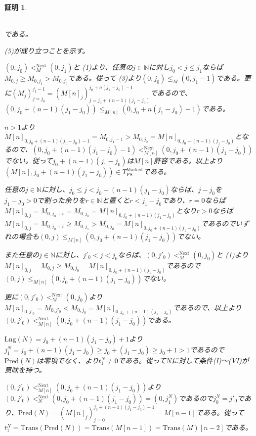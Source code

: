 \documentclass[dvipdfmx,uplatex]{jsarticle}
\theoremstyle{customnonumberbreakfortheorem}
\theoremstyle{customnonumberbreakforproof}
\newtheorem{hideableproof}{証明}
\begin{document}
\begin{hideableproof}
\begin{indented}
\begin{indented}
\begin{indented}
\begin{eqnarray*}
				\end{eqnarray*}
				\item である。
			\end{indented}
		\end{indented}
		\item
		\item (5)が成り立つことを示す。
		\item \((0,j_0) <_M^{\textrm{Next}} (0,j_1)\)と (1)より、任意の\(j \in \mathbb{N}\)に対し\(j_0 < j \leq j_1\)ならば\(M_{0,j} \geq M_{0,j_1} > M_{0,j_0}\)である。従って (3)より\((0,j_0) \leq_M (0,j_1-1)\)である。更に\((M_j)_{j=j_0}^{j_1-1} = (M[n]_j)_{j=j_0+(n-1)(j_1-j_0)}^{j_0+n(j_1-j_0)-1}\)であるので、\((0,j_0+(n-1)(j_1-j_0)) \leq_{M[n]} (0,j_0+n(j_1-j_0)-1)\)である。
		\item \(n > 1\)より\(M[n]_{0,j_0+(n-1)(j_1-j_0)-1} = M_{0,j_1-1} > M_{0,j_0} = M[n]_{0,j_0+(n-1)(j_1-j_0)}\)となるので、\((0,j_0+(n-1)(j_1-j_0)-1) <_{M[n]}^{\textrm{Next}} (0,j_0+(n-1)(j_1-j_0))\)でない。従って\(j_0+(n-1)(j_1-j_0)\)は\(M[n]\)許容である。以上より\((M[n],j_0+(n-1)(j_1-j_0)) \in T_{\textrm{PS}}^{\textrm{Marked}}\)である。
		\item 任意の\(j \in \mathbb{N}\)に対し、\(j_0 \leq j < j_0+(n-1)(j_1-j_0)\)ならば、\(j-j_0\)を\(j_1-j_0 > 0\)で割った余りを\(r \in \mathbb{N}\)と置くと\(r < j_1-j_0\)であり、\(r = 0\)ならば\(M[n]_{0,j} = M_{0,j_0+r} = M_{0,j_0} = M[n]_{0,j_0+(n-1)(j_1-j_0)}\)となり\(r > 0\)ならば\(M[n]_{0,j} = M_{0,j_0+r} \geq M_{0,j_1} > M_{0,j_0} = M[n]_{0,j_0+(n-1)(j_1-j_0)}\)であるのでいずれの場合も\((0,j) \leq_{M[n]} (0,j_0+(n-1)(j_1-j_0))\)でない。
		\item また任意の\(j \in \mathbb{N}\)に対し、\(j'_0 < j < j_0\)ならば、\((0,j'_0) <_M^{\textrm{Next}} (0,j_0)\)と (1)より\(M[n]_{0,j} = M_{0,j} \geq M_{0,j_0} = M[n]_{0,j_0+(n-1)(j_1-j_0)}\)であるので\((0,j) \leq_{M[n]} (0,j_0+(n-1)(j_1-j_0))\)でない。
		\item 更に\((0,j'_0) <_M^{\textrm{Next}} (0,j_0)\)より\(M[n]_{0,j'_0} = M_{0,j'_0} < M_{0,j_0} = M[n]_{0,j_0+(n-1)(j_1-j_0)}\)であるので、以上より\((0,j'_0) <_{M[n]}^{\textrm{Next}} (0,j_0+(n-1)(j_1-j_0))\)である。
		\item \(\textrm{Lng}(N) = j_0+(n-1)(j_1-j_0)+1\)より\(j_1^N = j_0+(n-1)(j_1-j_0) \geq j_0 + (j_1-j_0) \geq j_0+1 > 1\)であるので\(\textrm{Pred}(N)\)は零項でなく、より\(t_1^N \neq 0\)である。従って\(N\)に対して条件(I)～(VI)が意味を持つ。
		\item \((0,j'_0) <_{M[n]}^{\textrm{Next}} (0,j_0+(n-1)(j_1-j_0))\)より\((0,j'_0) <_N^{\textrm{Next}} (0,j_0+(n-1)(j_1-j_0)) = (0,j_1^N)\)であるので\(j_0^N = j'_0\)であり、\(\textrm{Pred}(N) = (M[n]_j)_{j=0}^{j_0+(n-1)(j_1-j_0)-1} = M[n-1]\)である。従って\(t_1^N = \textrm{Trans}(\textrm{Pred}(N)) = \textrm{Trans}(M[n-1]) = \textrm{Trans}(M)[n-2]\)である。

\end{indented}
\end{hideableproof}
\end{document}
